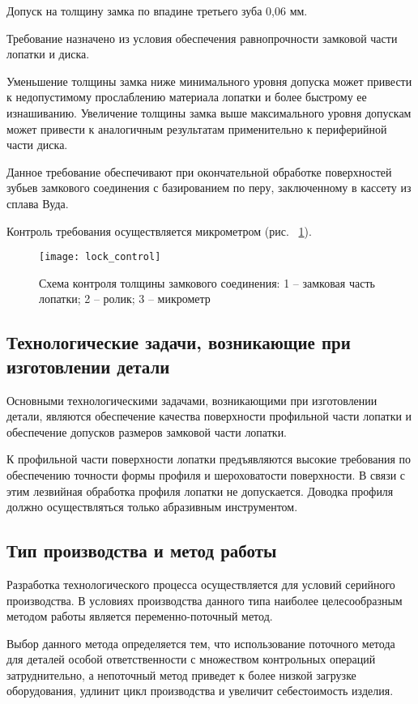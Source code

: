 Допуск на толщину замка по впадине третьего зуба 0,06 мм.

Требование назначено из условия обеспечения равнопрочности замковой части лопатки и диска.

Уменьшение толщины замка ниже минимального уровня допуска может привести к недопустимому прослаблению материала лопатки и более быстрому ее изнашиванию. Увеличение толщины замка выше максимального уровня допускам может привести к аналогичным результатам применительно к периферийной части диска.

Данное требование обеспечивают при окончательной обработке поверхностей зубьев замкового соединения с базированием по перу, заключенному в кассету из сплава Вуда.

Контроль требования осуществляется микрометром (рис. ~\ref{img:lock_control}).

\begin{figure}[H]
	\centering
	\texttt{[image: lock\_control]}
	\caption{Схема контроля толщины замкового соединения: 1 – замковая часть лопатки; 2 – ролик; 3 – микрометр}
	\label{img:lock_control}
\end{figure}

\subsection{Технологические задачи, возникающие при изготовлении детали}

Основными технологическими задачами, возникающими при изготовлении детали, являются обеспечение качества поверхности профильной части лопатки и обеспечение допусков размеров замковой части лопатки.

К профильной части поверхности лопатки предъявляются высокие требования по обеспечению точности формы профиля и шероховатости поверхности. В связи с этим лезвийная обработка профиля лопатки не допускается. Доводка профиля должно осуществляться только абразивным инструментом.

\subsection{Тип производства и метод работы}

Разработка технологического процесса осуществляется для условий серийного производства. В условиях производства данного типа наиболее целесообразным методом работы является переменно-поточный метод.

Выбор данного метода определяется тем, что использование поточного метода для деталей особой ответственности с множеством контрольных операций затруднительно, а непоточный метод приведет к более низкой загрузке оборудования, удлинит цикл производства и увеличит себестоимость изделия.

